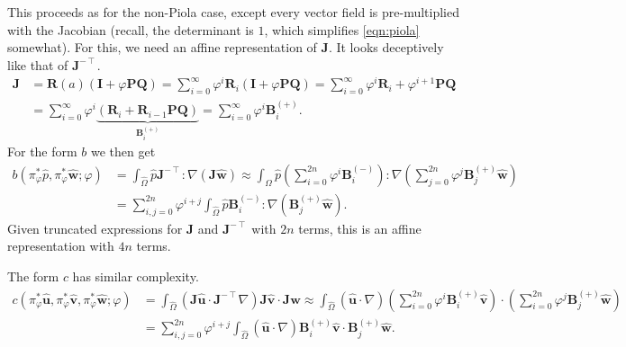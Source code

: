 \documentclass[onecolumn, twoside, a4paper, 11pt]{article}
\begin{document}
This proceeds as for the non-Piola case, except every vector field is
pre-multiplied with the Jacobian (recall, the determinant is $1$, which
simplifies \eqref{eqn:piola} somewhat). For this, we need an affine
representation of $\bm J$. It looks deceptively like that of $\bm
J^{-\intercal}$.
\begin{align}
  \nonumber
  \bm J
  &= \bm R(a) (\bm I + \varphi \bm P \bm Q)
  = \sum_{i=0}^\infty \varphi^i \bm R_i (\bm I + \varphi \bm P \bm Q)
  = \sum_{i=0}^\infty \varphi^i \bm R_i + \varphi^{i+1} \bm P \bm Q \\
  &= \sum_{i=0}^\infty
    \varphi^i \underbrace{\left(
    \bm R_i + \bm R_{i-1} \bm P \bm Q
    \right)}_{\bm B^{(+)}_i} = \sum_{i=0}^\infty \varphi^i \bm B^{(+)}_i.
\end{align}
For the form $b$ we then get
\begin{align}
  \nonumber
  b(
    \pi_{\varphi}^* \hat{p},
    \pi_{\varphi}^* \hat{\bm w};
    \varphi
  ) &= \int_{\hat{\Omega}} \hat{p} \bm J^{-\intercal} : \nabla (\bm J \hat{\bm w})
    \approx \int_{\hat{\Omega}} \hat{p}
      \left( \sum_{i=0}^{2n} \varphi^i \bm B^{(-)}_i \right) : \nabla
      \left( \sum_{j=0}^{2n} \varphi^j \bm B^{(+)}_j \hat{\bm w} \right) \\
    &= \sum_{i,j=0}^{2n} \varphi^{i+j}
      \int_{\hat{\Omega}} \hat{p} \bm B^{(-)}_i :
      \nabla \left( \bm B^{(+)}_j \hat{\bm w} \right).
\end{align}
Given truncated expressions for $\bm J$ and $\bm J^{-\intercal}$ with $2n$
terms, this is an affine representation with $4n$ terms.

The form $c$ has similar complexity.
\begin{align}
  \nonumber
  c(
    \pi_{\varphi}^* \hat{\bm u},
    \pi_{\varphi}^* \hat{\bm v},
    \pi_{\varphi}^* \hat{\bm w};
    \varphi
  )
  &= \int_{\hat{\Omega}} (\bm J \hat{\bm u} \cdot \bm J^{-\intercal}\nabla)
    \bm J \hat{\bm v} \cdot \bm J \hat{\bm w}
  \approx \int_{\hat{\Omega}} (\hat{\bm u} \cdot \nabla)
      \left( \sum_{i=0}^{2n} \varphi^i \bm B^{(+)}_i \hat{\bm v} \right) \cdot
    \left( \sum_{i=0}^{2n} \varphi^j \bm B^{(+)}_j \hat{\bm w} \right) \\
  &= \sum_{i,j=0}^{2n} \varphi^{i+j}
    \int_{\hat{\Omega}} (\hat{\bm u} \cdot \nabla) \bm B^{(+)}_i \hat{\bm v} \cdot \bm B^{(+)}_j \hat{\bm w}.
\end{align}
\end{document}
